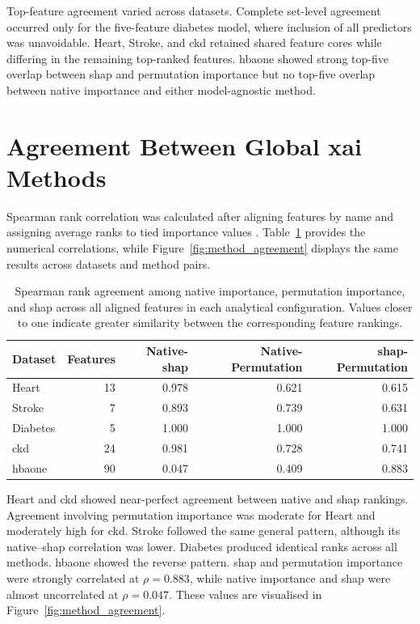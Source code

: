 Top-feature agreement varied across datasets. Complete set-level agreement occurred only for the five-feature diabetes model, where inclusion of all predictors was unavoidable. Heart, Stroke, and \gls{ckd} retained shared feature cores while differing in the remaining top-ranked features. \gls{hbaone} showed strong top-five overlap between \gls{shap} and permutation importance but no top-five overlap between native importance and either model-agnostic method.

\section{Agreement Between Global \gls{xai} Methods}

Spearman rank correlation was calculated after aligning features by name and assigning average ranks to tied importance values \citep{spearman_proof_1904}. Table~\ref{tab:rank_agreement} provides the numerical correlations, while Figure~\ref{fig:method_agreement} displays the same results across datasets and method pairs.

\begin{table}[htbp]
    \centering
    \small
    \caption{Spearman rank agreement among native importance, permutation importance, and \gls{shap} across all aligned features in each analytical configuration. Values closer to one indicate greater similarity between the corresponding feature rankings.}
    \label{tab:rank_agreement}
    \begin{tabular}{@{}lrrrr@{}}
        \toprule
        \textbf{Dataset} & \textbf{Features} & \textbf{Native-\gls{shap}} & \textbf{Native-Permutation} & \textbf{\gls{shap}-Permutation} \\
        \midrule
        Heart & 13 & 0.978 & 0.621 & 0.615 \\
        Stroke & 7 & 0.893 & 0.739 & 0.631 \\
        Diabetes & 5 & 1.000 & 1.000 & 1.000 \\
        \gls{ckd} & 24 & 0.981 & 0.728 & 0.741 \\
        \gls{hbaone} & 90 & 0.047 & 0.409 & 0.883 \\
        \bottomrule
    \end{tabular}
\end{table}

Heart and \gls{ckd} showed near-perfect agreement between native and \gls{shap} rankings. Agreement involving permutation importance was moderate for Heart and moderately high for \gls{ckd}. Stroke followed the same general pattern, although its native--\gls{shap} correlation was lower. Diabetes produced identical ranks across all methods. \gls{hbaone} showed the reverse pattern. \gls{shap} and permutation importance were strongly correlated at $\rho=0.883$, while native importance and \gls{shap} were almost uncorrelated at $\rho=0.047$. These values are visualised in Figure~\ref{fig:method_agreement}.

